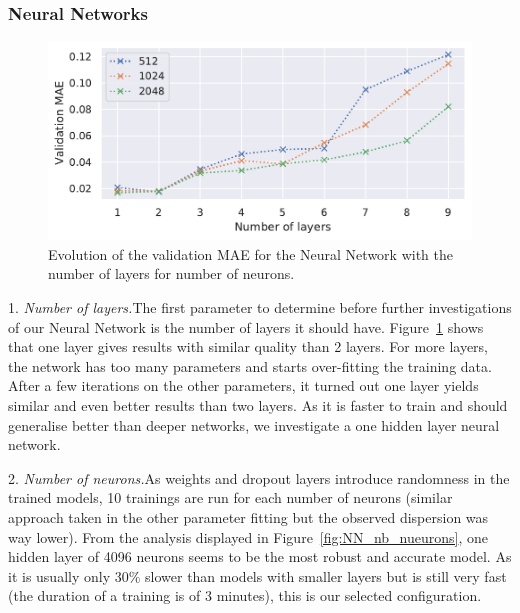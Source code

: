 \documentclass[reprint,amsmath,amssymb,aps,pra]{revtex4-2}
\begin{document}
\subsubsection{Neural Networks}

\begin{figure}[H]
\includegraphics[width=\columnwidth]{analytical_continuation/NN_nb_layers.pdf}
\caption{\label{fig:NN_nb_layers}Evolution of the validation MAE for the Neural Network with the number of layers for number of neurons.}
\end{figure}

1. \emph{Number of layers.}\quad The first parameter to determine before further investigations of our Neural Network is the number of layers it should have. Figure~\ref{fig:NN_nb_layers} shows that one layer gives results with similar quality than 2 layers. For more layers, the network has too many parameters and starts over-fitting the training data. After a few iterations on the other parameters, it turned out one layer yields similar and even better results than two layers. As it is faster to train and should generalise better than deeper networks, we investigate a one hidden layer neural network.

2. \emph{Number of neurons.}\quad As weights and dropout layers introduce randomness in the trained models, 10 trainings are run for each number of neurons (similar approach taken in the other parameter fitting but the observed dispersion was way lower). From the analysis displayed in Figure~\ref{fig:NN_nb_nueurons}, one hidden layer of 4096 neurons seems to be the most robust and accurate model. As it is usually only 30\% slower than models with smaller layers but is still very fast (the duration of a training is of 3 minutes), this is our selected configuration.
\end{document}
